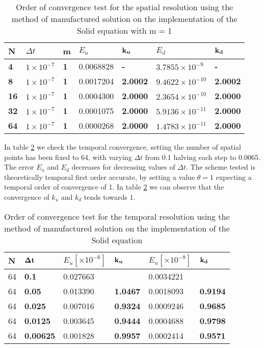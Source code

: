 \begin{table}[H]
\centering
\label{tab:MMS_SOLID_SPACE}
\begin{tabular}{|l|l|l|l|l|l|l|}
\hline
\textbf{N} & $\Delta t$ & \textbf{m} & $E_u $ & $\bold{k_u}$ & $E_d $ & $\bold{k_d}$ \\ \hline
\textbf{4} & $1\times10^{-7}$ & \textbf{1} & 0.0068828 & \textbf{-} & $3.7855 \times 10^{-9} $ & \textbf{-} \\ \hline
\textbf{8} & $1\times10^{-7}$ & \textbf{1} & 0.0017204 & \textbf{2.0002} & $9.4622 \times 10^{-10} $ & \textbf{2.0002} \\ \hline
\textbf{16} & $1\times10^{-7}$ & \textbf{1} & 0.0004300 & \textbf{2.0000} & $2.3654 \times 10^{-10} $ & \textbf{2.0000} \\ \hline
\textbf{32} & $1\times10^{-7}$ & \textbf{1} & 0.0001075 & \textbf{2.0000} & $5.9136 \times 10^{-11} $ & \textbf{2.0000} \\ \hline
\textbf{64} & $1\times10^{-7}$ & \textbf{1} & 0.0000268 & \textbf{2.0000} & $1.4783 \times 10^{-11} $ & \textbf{2.0000} \\ \hline
\end{tabular}
\caption{Order of convergence test for the spatial resolution using the method of manufactured solution on the implementation of the Solid equation with m = 1}
\end{table}


In table \ref{tab:MMS_SOLID_TIME} we check the temporal convergence, setting the number of spatial points has been fixed to 64, with varying $\Delta t $ from $0.1$ halving each step to $0.0065$. The error $E_u$ and $E_d$ decreases for decreasing values of $\Delta t$. The scheme tested is theoretically temporal first order accurate, by setting a value $\theta = 1$ expecting a temporal order of convergence of 1. In table \ref{tab:MMS_SOLID_TIME} we can observe that the convergence of $k_u$ and $k_d$ tends towards 1.

\begin{table}[H]
\centering
\label{tab:MMS_SOLID_TIME}
\begin{tabular}{|l|l|l|l|l|l|}
\hline
N & $\bold{\Delta t}$ & $E_u [\times10^{-6}]$ & $\bold{k_u}$ & $E_u [\times10^{-8}]$ & $\bold{k_d}$ \\ \hline
64 & \textbf{0.1} & 0.027663 & \textbf{} & 0.0034221 & \textbf{} \\ \hline
64 & \textbf{0.05} & 0.013390 & \textbf{1.0467} & 0.0018093 & \textbf{0.9194} \\ \hline
64 & \textbf{0.025} & 0.007016 & \textbf{0.9324} & 0.0009246 & \textbf{0.9685} \\ \hline
64 & \textbf{0.0125} & 0.003645 & \textbf{0.9444} & 0.0004688 & \textbf{0.9798} \\ \hline
64 & \textbf{0.00625} & 0.001828 & \textbf{0.9957} & 0.0002414 & \textbf{0.9571} \\ \hline
\end{tabular}
\caption{Order of convergence test for the temporal resolution using the method of manufactured solution on the implementation of the Solid equation}
\end{table}

